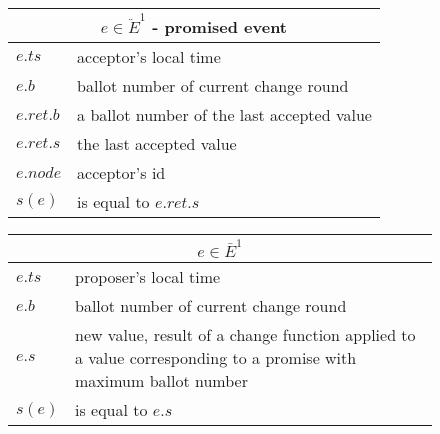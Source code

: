 \documentclass[a4paper,USenglish]{lipics-v2018}
\theoremstyle{definition}
\begin{document}
\begin{appendices}
        \begin{figure}[!h]
            \centering
            \begin{minipage}{0.47\textwidth}
                \centering
                \begin{tabular}{|p{1cm}|p{4cm}|}
                    \hline
                    \multicolumn{2}{|c|}{$e \in \ddot{E}^1$ - promised event}\\
                    \hline
                    $e.ts$ & acceptor's local time\\
                    \hline
                    $e.b$ & ballot number of current change round\\
                    \hline
                    $e.ret.b$ & a ballot number of the last accepted value\\
                    \hline
                    $e.ret.s$ & the last accepted value\\
                    \hline
                    $e.node$ & acceptor's id\\
                    \hline
                    \hline
                    $s(e)$ & is equal to $e.ret.s$\\
                    \hline
                \end{tabular}
            \end{minipage}
            \hspace{\fill} %
            \begin{minipage}{0.47\textwidth}
                \centering
                \begin{tabular}{|p{1cm}|p{4cm}|}
                    \hline
                    \multicolumn{2}{|c|}{$e \in \bar{E}^1$}\\
                    \hline
                    $e.ts$ & proposer's local time\\
                    \hline
                    $e.b$ & ballot number of current change round\\
                    \hline
                    $e.s$ & new value, result of a change function applied to a value corresponding to a promise with maximum ballot number\\
                    \hline
                    \hline
                    $s(e)$ & is equal to $e.s$\\
                    \hline
                \end{tabular}
            \end{minipage}
            

\end{figure}
\end{appendices}
\end{document}
